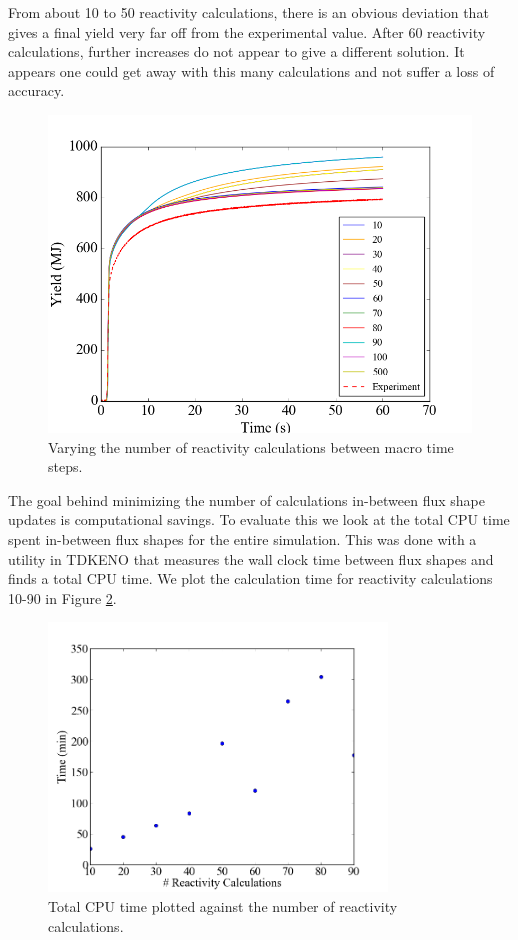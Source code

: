 \documentclass{anstrans}
\begin{document}
   From about 10 to 50 reactivity calculations, there is an obvious deviation that gives a final yield very far off from the experimental value.  After 60 reactivity calculations, further increases do not appear to give a different solution.  It appears one could get away with this many calculations and not suffer a loss of accuracy.

\begin{figure}[h]
    \centering
    \includegraphics[width = 9 cm]{figures/ptkinvar.png}
    \caption{Varying the number of reactivity calculations between macro time steps.}
    \label{fig:ptkinvar}
\end{figure}

The goal behind minimizing the number of calculations in-between flux shape updates is computational savings.  To evaluate this we look at the total CPU time spent in-between flux shapes for the entire simulation.  This was done with a utility in TDKENO that measures the wall clock time between flux shapes and finds a total CPU time. We plot the calculation time for reactivity calculations 10-90 in Figure \ref{fig:ptkin_time}.  

\begin{figure}[h]
    \centering
    \includegraphics[width=9cm]{figures/ptkin_time_var.png}
    \caption{Total CPU time plotted against the number of reactivity calculations. }
    \label{fig:ptkin_time}
\end{figure}
\end{document}
